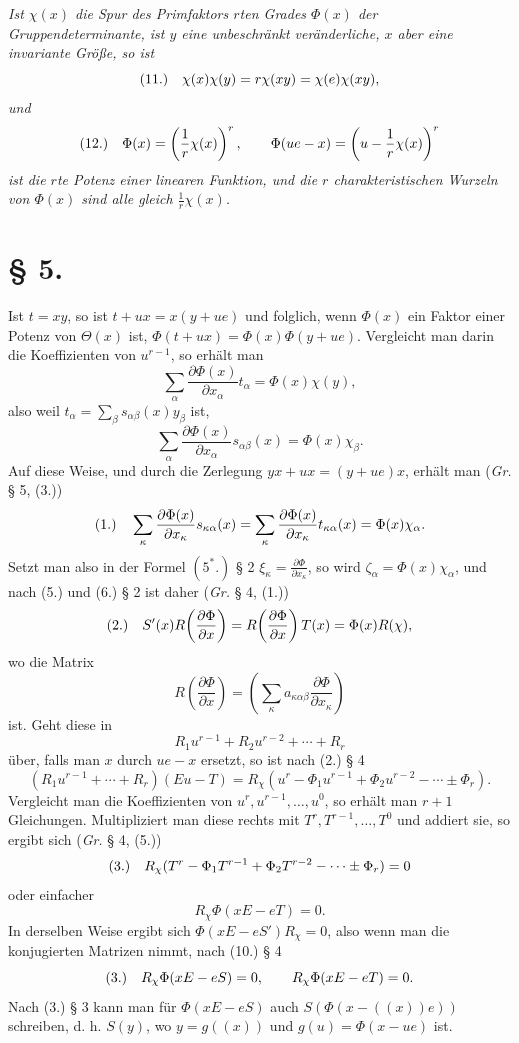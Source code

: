 \documentclass[11pt]{article}
\newcommand{\fnum}[1]{\textup{(\ensuremath{#1}.)}\quad}
\begin{document}
\emph{Ist $\chi(x)$ die Spur des Primfaktors $r$ten Grades $\Phi(x)$ der Gruppendeterminante, ist $y$ eine unbeschränkt veränderliche, $x$ aber eine invariante Größe, so ist}
\[
\fnum{11} \chi(x)\chi(y)=r\chi(xy)=\chi(e)\chi(xy),
\]
\emph{und}
\[
\fnum{12} \Phi(x)=\left(\frac1r\chi(x)\right)^r,\qquad
 \Phi(ue-x)=\left(u-\frac1r\chi(x)\right)^r
\]
\emph{ist die $r$te Potenz einer linearen Funktion, und die $r$ charakteristischen Wurzeln von $\Phi(x)$ sind alle gleich $\frac1r\chi(x)$.}

\section*{§ 5.}

Ist $t=xy$, so ist $t+ux=x(y+ue)$ und folglich, wenn $\Phi(x)$ ein Faktor einer Potenz von $\Theta(x)$ ist, $\Phi(t+ux)=\Phi(x)\Phi(y+ue)$. Vergleicht man darin die Koeffizienten von $u^{r-1}$, so erhält man
\[
 \sum_\alpha \frac{\partial\Phi(x)}{\partial x_\alpha}t_\alpha=\Phi(x)\chi(y),
\]
also weil $t_\alpha=\sum_\beta s_{\alpha\beta}(x)y_\beta$ ist,
\[
 \sum_\alpha\frac{\partial\Phi(x)}{\partial x_\alpha}s_{\alpha\beta}(x)=\Phi(x)\chi_\beta .
\]
Auf diese Weise, und durch die Zerlegung $yx+ux=(y+ue)x$, erhält man (\emph{Gr.} § 5, (3.))
\[
\fnum{1} \sum_\kappa\frac{\partial\Phi(x)}{\partial x_\kappa}s_{\kappa\alpha}(x)
=\sum_\kappa\frac{\partial\Phi(x)}{\partial x_\kappa}t_{\kappa\alpha}(x)
=\Phi(x)\chi_\alpha .
\]
Setzt man also in der Formel $(5^*.)$ § 2 $\xi_\kappa=\frac{\partial\Phi}{\partial x_\kappa}$, so wird $\zeta_\alpha=\Phi(x)\chi_\alpha$, und nach (5.) und (6.) § 2 ist daher (\emph{Gr.} § 4, (1.))
\[
\fnum{2} S'(x)R\!\left(\frac{\partial\Phi}{\partial x}\right)
=R\!\left(\frac{\partial\Phi}{\partial x}\right)T(x)
=\Phi(x)R(\chi),
\]
wo die Matrix
\[
 R\!\left(\frac{\partial\Phi}{\partial x}\right)
 =\left(\sum_\kappa a_{\kappa\alpha\beta}\frac{\partial\Phi}{\partial x_\kappa}\right)
\]
ist. Geht diese in
\[
 R_1u^{r-1}+R_2u^{r-2}+\cdots+R_r
\]
über, falls man $x$ durch $ue-x$ ersetzt, so ist nach (2.) § 4
\[
 (R_1u^{r-1}+\cdots+R_r)(Eu-T)
=R_\chi(u^r-\Phi_1u^{r-1}+\Phi_2u^{r-2}-\cdots\pm\Phi_r).
\]
Vergleicht man die Koeffizienten von $u^r,u^{r-1},\ldots,u^0$, so erhält man $r+1$ Gleichungen. Multipliziert man diese rechts mit $T^r,T^{r-1},\ldots,T^0$ und addiert sie, so ergibt sich (\emph{Gr.} § 4, (5.))
\[
\fnum{3} R_\chi(T^r-\Phi_1T^{r-1}+\Phi_2T^{r-2}-\cdots\pm\Phi_r)=0
\]
oder einfacher
\[
 R_\chi\Phi(xE-eT)=0.
\]
In derselben Weise ergibt sich $\Phi(xE-eS')R_\chi=0$, also wenn man die konjugierten Matrizen nimmt, nach (10.) § 4
\[
\fnum{3} R_\chi\Phi(xE-eS)=0,\qquad R_\chi\Phi(xE-eT)=0.
\]
Nach (3.) § 3 kann man für $\Phi(xE-eS)$ auch $S(\Phi(x-((x))e))$ schreiben, d. h. $S(y)$, wo $y=g((x))$ und $g(u)=\Phi(x-ue)$ ist.
\end{document}
